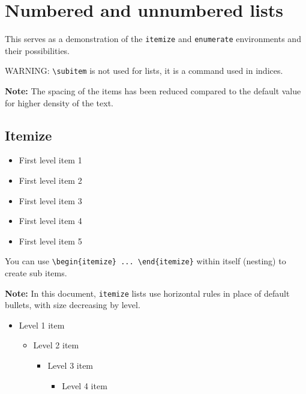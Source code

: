 \section{Numbered and unnumbered lists}
This serves as a demonstration of the \verb|itemize| and \verb|enumerate| environments and their possibilities.

\textcolor[rgb]{0.7, 0, 0}{WARNING}: \verb|\subitem| is not used for lists, it is a command used in indices.

\textbf{Note:} The spacing of the items has been reduced compared to the default value for higher density of the text.

\subsection{Itemize}

    \begin{itemize}
        \item First level item 1
        \item First level item 2
        \item First level item 3
        \item First level item 4
        \item First level item 5
    \end{itemize}

    You can use \verb|\begin{itemize} ... \end{itemize}| within itself (nesting) to create sub items.

    \textbf{Note:} In this document, \texttt{itemize} lists use horizontal rules in place of default bullets, with size decreasing by level.

    \begin{itemize}
        \item Level 1 item
        \begin{itemize}
            \item Level 2 item
            \begin{itemize}
                \item Level 3 item
                \begin{itemize}
                    \item Level 4 item
                \end{itemize}
            \end{itemize}
        \end{itemize}
    \end{itemize}


